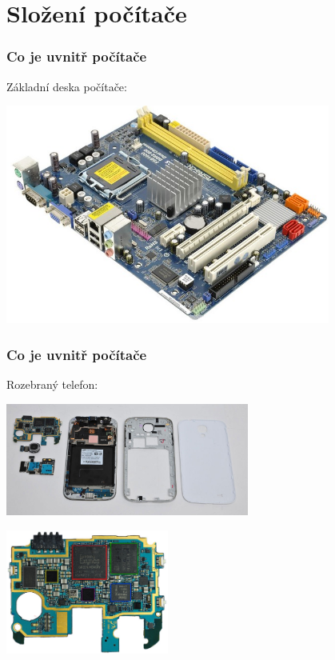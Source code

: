\documentclass{beamer}
\begin{document}
\section{Složení počítače}
\begin{frame}
\frametitle{Co je uvnitř počítače}

Základní deska počítače:
\begin{center}
   \includegraphics[width=0.8\textwidth]{fig/motherboard.jpg}
\end{center}

\end{frame}

\begin{frame}
\frametitle{Co je uvnitř počítače}

Rozebraný telefon:
\begin{center}
   \includegraphics[width=0.6\textwidth]{fig/mobile.jpg}
\end{center}
\begin{center}
   \includegraphics[width=0.4\textwidth]{fig/mobile-cpu.jpg}
\end{center}
\end{frame}
\end{document}
